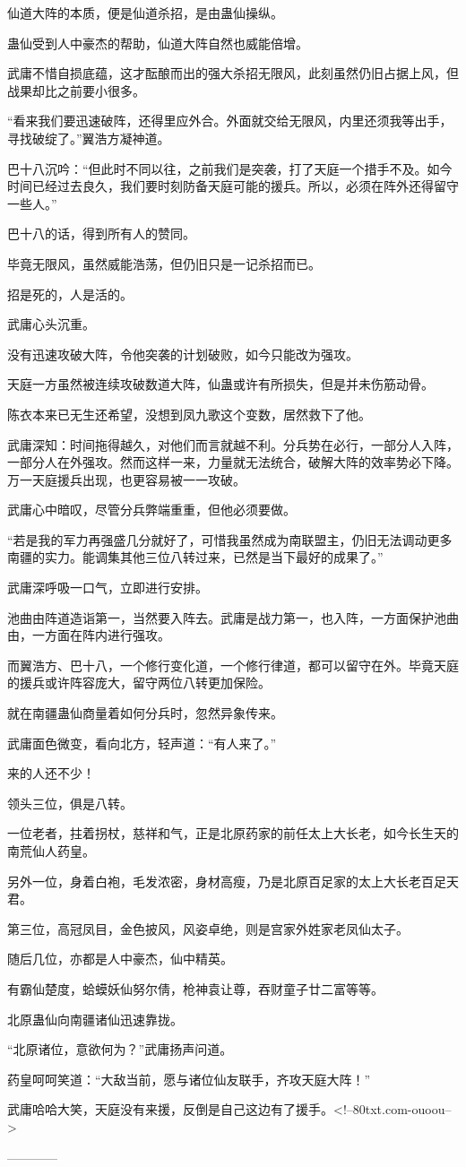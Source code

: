 \begin{this_body}
仙道大阵的本质，便是仙道杀招，是由蛊仙操纵。

蛊仙受到人中豪杰的帮助，仙道大阵自然也威能倍增。

武庸不惜自损底蕴，这才酝酿而出的强大杀招无限风，此刻虽然仍旧占据上风，但战果却比之前要小很多。

“看来我们要迅速破阵，还得里应外合。外面就交给无限风，内里还须我等出手，寻找破绽了。”翼浩方凝神道。

巴十八沉吟：“但此时不同以往，之前我们是突袭，打了天庭一个措手不及。如今时间已经过去良久，我们要时刻防备天庭可能的援兵。所以，必须在阵外还得留守一些人。”

巴十八的话，得到所有人的赞同。

毕竟无限风，虽然威能浩荡，但仍旧只是一记杀招而已。

招是死的，人是活的。

武庸心头沉重。

没有迅速攻破大阵，令他突袭的计划破败，如今只能改为强攻。

天庭一方虽然被连续攻破数道大阵，仙蛊或许有所损失，但是并未伤筋动骨。

陈衣本来已无生还希望，没想到凤九歌这个变数，居然救下了他。

武庸深知：时间拖得越久，对他们而言就越不利。分兵势在必行，一部分人入阵，一部分人在外强攻。然而这样一来，力量就无法统合，破解大阵的效率势必下降。万一天庭援兵出现，也更容易被一一攻破。

武庸心中暗叹，尽管分兵弊端重重，但他必须要做。

“若是我的军力再强盛几分就好了，可惜我虽然成为南联盟主，仍旧无法调动更多南疆的实力。能调集其他三位八转过来，已然是当下最好的成果了。”

武庸深呼吸一口气，立即进行安排。

池曲由阵道造诣第一，当然要入阵去。武庸是战力第一，也入阵，一方面保护池曲由，一方面在阵内进行强攻。

而翼浩方、巴十八，一个修行变化道，一个修行律道，都可以留守在外。毕竟天庭的援兵或许阵容庞大，留守两位八转更加保险。

就在南疆蛊仙商量着如何分兵时，忽然异象传来。

武庸面色微变，看向北方，轻声道：“有人来了。”

来的人还不少！

领头三位，俱是八转。

一位老者，拄着拐杖，慈祥和气，正是北原药家的前任太上大长老，如今长生天的南荒仙人药皇。

另外一位，身着白袍，毛发浓密，身材高瘦，乃是北原百足家的太上大长老百足天君。

第三位，高冠凤目，金色披风，风姿卓绝，则是宫家外姓家老凤仙太子。

随后几位，亦都是人中豪杰，仙中精英。

有霸仙楚度，蛤蟆妖仙努尔倩，枪神袁让尊，吞财童子廿二富等等。

北原蛊仙向南疆诸仙迅速靠拢。

“北原诸位，意欲何为？”武庸扬声问道。

药皇呵呵笑道：“大敌当前，愿与诸位仙友联手，齐攻天庭大阵！”

武庸哈哈大笑，天庭没有来援，反倒是自己这边有了援手。<!--80txt.com-ouoou-->

------------

\end{this_body}


